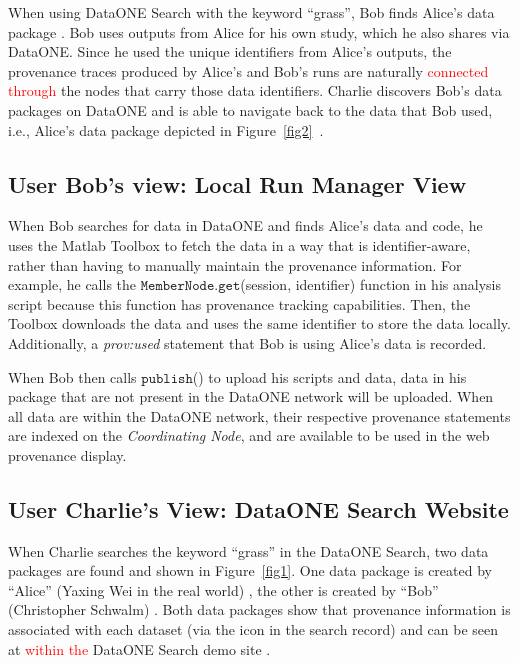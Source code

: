 \documentclass[a4paper]{llncs}
\newcommand{\mytt}[1]{\ensuremath{\mathtt{#1}}}
\begin{document}
When using DataONE Search with the keyword ``grass'', Bob finds Alice's data package \cite{yaxing}. Bob uses outputs from Alice for his own study, which he also shares via DataONE. Since he used the unique identifiers from Alice's outputs, the provenance traces produced by Alice's and Bob's runs are naturally \textcolor{red}{connected through} the nodes that carry those data identifiers. Charlie discovers Bob's data packages on DataONE and is able to navigate back to the data that Bob used, i.e., Alice's data package depicted in Figure~\ref{fig2}~\cite{Katz,data-trajectories}.


\subsection{User Bob's view: Local Run Manager View}

When Bob searches for data in DataONE and finds Alice's data and code, he uses the Matlab Toolbox to fetch the data in a way that is identifier-aware, rather than having to manually maintain the provenance information. For example, he calls the \mytt{MemberNode.get}(session, identifier) function in his analysis script because this function has provenance tracking capabilities. Then, the Toolbox downloads the data and uses the same identifier to store the data locally. Additionally, a \emph{prov:used} statement that Bob is using Alice's data is recorded.

When Bob then calls \mytt{publish}() to upload his scripts and data, data in his package that are not present in the DataONE network will be uploaded.  When all data are within the DataONE network, their respective provenance statements are indexed on the \emph{Coordinating Node}, and are available to be used in the web provenance display.



\subsection{User Charlie's View: DataONE Search Website}

When Charlie searches the keyword ``grass'' in the DataONE Search, two data packages are found and shown in Figure~\ref{fig1}. One data package is created by ``Alice'' (Yaxing Wei in the real world) \cite{yaxing}, the other is created by ``Bob'' (Christopher Schwalm) \cite{christopher}. Both data packages show that provenance information is associated with each dataset (via the icon in the search record) and can be seen at \textcolor{red}{within the} DataONE Search demo site \cite{dataone-demo}.
\end{document}
